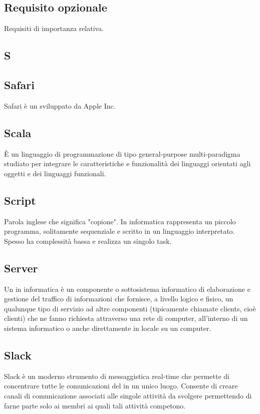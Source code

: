 \subsection{Requisito opzionale}
Requisiti di importanza relativa.

\newpage

\begin{center}
\Huge\section{\uppercase{S}}
\end{center}

\subsection{Safari}
Safari è un   sviluppato da Apple Inc. 

\subsection{Scala}
È un linguaggio di programmazione di tipo general-purpose multi-paradigma studiato per integrare le caratteristiche e funzionalità dei linguaggi orientati agli oggetti e dei linguaggi funzionali.

\subsection{Script}
Parola inglese che significa "copione". In informatica rappresenta un piccolo
programma, solitamente sequenziale e scritto in un linguaggio interpretato.
Spesso ha complessità bassa e realizza un singolo task.

\subsection{Server}
Un  in informatica è un componente o sottosistema informatico di elaborazione e gestione del traffico di informazioni che fornisce, a livello logico e fisico, un qualunque tipo di servizio ad altre componenti (tipicamente chiamate clients, cioè clienti) che ne fanno richiesta attraverso una rete di computer, all'interno di un sistema informatico o anche direttamente in locale su un computer.

\subsection{Slack}
Slack è un moderno strumento di messaggistica real-time che permette di concentrare tutte le comunicazioni del  in un unico luogo.
Consente di creare canali di comunicazione associati alle singole attività da svolgere permettendo di farne parte solo ai membri ai quali tali attività competono.

